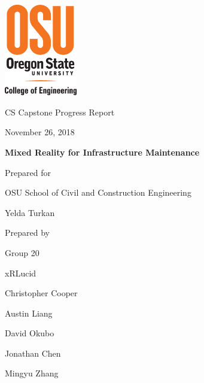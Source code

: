 \documentclass[onecolumn, draftclsnofoot,10pt, compsoc]{IEEEtran}
\def \CapstoneTeamName{		xRLucid}
\def \CapstoneTeamNumber{		20}
\def \GroupMemberOne{			Christopher Cooper}
\def \GroupMemberTwo{			Austin Liang}
\def \GroupMemberThree{			David Okubo}
\def \GroupMemberFour{			Jonathan Chen}
\def \GroupMemberFive{			Mingyu Zhang}
\def \CapstoneProjectName{		Mixed Reality for Infrastructure Maintenance}
\def \CapstoneSponsorCompany{	OSU School of Civil and Construction Engineering}
\def \CapstoneSponsorPerson{		Yelda Turkan}
\def \DocType{	%
				Progress Report
				}
\newcommand{\NameSigPair}[1]{\par
\makebox[2.75in][r]{#1} \hfil 	\makebox[3.25in]{\makebox[2.25in]{\hrulefill} \hfill		\makebox[.75in]{\hrulefill}}
\par\vspace{-12pt} \textit{\tiny\noindent
\makebox[2.75in]{} \hfil		\makebox[3.25in]{\makebox[2.25in][r]{Signature} \hfill	\makebox[.75in][r]{Date}}}}
\renewcommand{\NameSigPair}[1]{#1}
\begin{document}
\begin{titlepage}
    \begin{singlespace}
    	\includegraphics[height=4cm]{coe_v_spot1}
        \hfill 
        \par\vspace{.2in}
        \centering
        \scshape{
            \huge CS Capstone \DocType \par
            {\large November 26, 2018}\par
            \vspace{.5in}
            \textbf{\Huge\CapstoneProjectName}\par
            \vfill
            {\large Prepared for}\par
            \Huge \CapstoneSponsorCompany\par
            \vspace{5pt}
            {\Large\NameSigPair{\CapstoneSponsorPerson}\par}
            {\large Prepared by }\par
            Group\CapstoneTeamNumber\par
            \CapstoneTeamName\par 
            \vspace{5pt}
            {\Large
                \NameSigPair{\GroupMemberOne}\par
                \NameSigPair{\GroupMemberTwo}\par
                \NameSigPair{\GroupMemberThree}\par
                \NameSigPair{\GroupMemberFour}\par
                \NameSigPair{\GroupMemberFive}\par
            }
            \vspace{20pt}
        }


\end{singlespace}
\end{titlepage}
\end{document}
